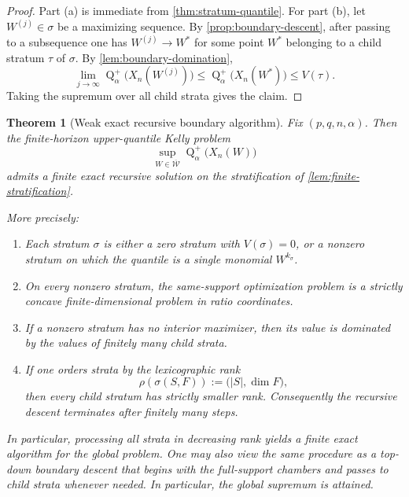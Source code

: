 \documentclass[11pt]{article}
\newtheorem{theorem}{Theorem}[section]
\theoremstyle{definition}
\newcommand{\1}{\mathbf{1}}
\newcommand{\Quant}{\operatorname{Q}}
\begin{document}
\begin{proof}
Part (a) is immediate from \cref{thm:stratum-quantile}. For part (b), let $W^{(j)}\in\sigma$ be a maximizing sequence. By \cref{prop:boundary-descent}, after passing to a subsequence one has $W^{(j)}\to W^*$ for some point $W^*$ belonging to a child stratum $\tau$ of $\sigma$. By \cref{lem:boundary-domination},
\[
\lim_{j\to\infty}\Quant_\alpha^+\bigl(X_n(W^{(j)})\bigr)
\le
\Quant_\alpha^+\bigl(X_n(W^*)\bigr)
\le
V(\tau).
\]
Taking the supremum over all child strata gives the claim.
\end{proof}

\begin{theorem}[Weak exact recursive boundary algorithm]\label{thm:weak-recursion}
Fix $(p,q,n,\alpha)$. Then the finite-horizon upper-quantile Kelly problem
\[
\sup_{W\in\overline{\mathcal W}} \Quant_\alpha^+\bigl(X_n(W)\bigr)
\]
admits a finite exact recursive solution on the stratification of \cref{lem:finite-stratification}.

More precisely:
\begin{enumerate}[label=(\alph*), itemsep=4pt]
  \item Each stratum $\sigma$ is either a zero stratum with $V(\sigma)=0$, or a nonzero stratum on which the quantile is a single monomial $W^{k_\sigma}$.
  \item On every nonzero stratum, the same-support optimization problem is a strictly concave finite-dimensional problem in ratio coordinates.
  \item If a nonzero stratum has no interior maximizer, then its value is dominated by the values of finitely many child strata.
  \item If one orders strata by the lexicographic rank
  \[
  \rho(\sigma(S,F)):=\bigl(|S|,\dim F\bigr),
  \]
  then every child stratum has strictly smaller rank. Consequently the recursive descent terminates after finitely many steps.
\end{enumerate}
In particular, processing all strata in decreasing rank yields a finite exact algorithm for the global problem. One may also view the same procedure as a top-down boundary descent that begins with the full-support chambers and passes to child strata whenever needed. In particular, the global supremum is attained.
\end{theorem}
\end{document}

